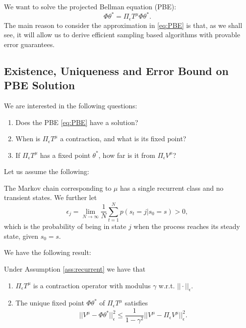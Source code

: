 We want to solve the projected Bellman equation (PBE):
\begin{equation}\label{eq:PBE}
\Phi \theta^*  = \Pi_\epsilon T^\mu \Phi \theta^*.
\end{equation}
The main reason to consider the approximation in \eqref{eq:PBE} is that, as we shall see, it will allow us to derive efficient sampling based algorithms with provable error guarantees.

\subsection{Existence, Uniqueness and Error Bound on PBE Solution}
We are interested in the following questions:
\begin{enumerate}
\item Does the PBE \eqref{eq:PBE} have a solution?
\item When is $\Pi_\epsilon T^\mu$ a contraction, and what is its fixed point?
\item If $\Pi_\epsilon T^\mu$ has a fixed point $\theta^*$, how far is it from $\Pi_\epsilon V^\mu$?
\end{enumerate}
Let us assume the following:
\begin{assumption}\label{ass:recurrent}The Markov chain corresponding to $\mu$ has a single recurrent class and no transient states. We further let
$$\epsilon_j = \lim_{N\rightarrow \infty} \frac{1}{N} \sum_{t=1}^N p(s_t=j|s_0=s)>0,$$
which is the probability of being in state $j$ when the process reaches its steady state, given $s_0=s$.
\end{assumption}
We have the following result:
\begin{proposition}\label{prop:PBE_contraction} Under Assumption \ref{ass:recurrent} we have that
\begin{enumerate}
\item $\Pi_\epsilon T^\mu$ is a contraction operator with modulus $\gamma$ w.r.t. $||\cdot||_\epsilon$.
\item The unique fixed point $\Phi \theta^*$ of $\Pi_\epsilon T^\mu$ satisfies
$$||V^\mu - \Phi \theta^*||_\epsilon^2 \le \frac{1}{1-\gamma^2}||V^\mu-\Pi_\epsilon V^\mu||_\epsilon^2.$$
\end{enumerate}
\end{proposition}
